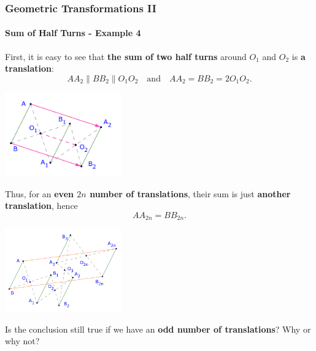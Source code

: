 \documentclass[8pt,xcolor=table,dvipsnames]{beamer}
\begin{document}
\begin{frame}[t]
    \frametitle{Geometric Transformations II}
    \framesubtitle{Sum of Half Turns - Example 4}
    \begin{overprint}
        First, it is easy to see that \textbf{the sum of two half turns} around $O_1$ and $O_2$ is \textbf{a translation}:
        \[ 
            AA_2 \parallel BB_2 \parallel O_1O_2 \quad \text{and} \quad AA_2 = BB_2 = 2O_1O_2.
        \]
        \begin{center}
            \includegraphics[width=5cm]{./svg/pdf/translation-1b.pdf}
        \end{center}
        Thus, for an \textbf{even $2n$ number of translations}, their sum is just \textbf{another translation}, hence
        \[
            AA_{2n} = BB_{2n}.
        \]
        \begin{center}
            \includegraphics[width=5cm]{./svg/pdf/translation-1.pdf}
        \end{center}
    
        \bigbreak
        Is the conclusion still true if we have an \textbf{odd number of translations}? Why or why not?        
    \end{overprint}
\end{frame}
\end{document}
